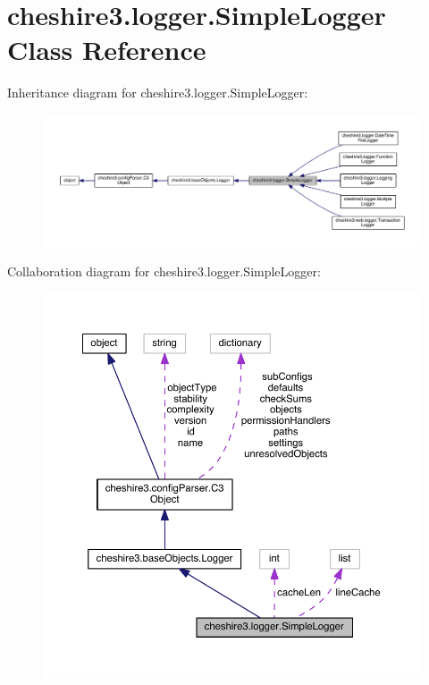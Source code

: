 \hypertarget{classcheshire3_1_1logger_1_1_simple_logger}{\section{cheshire3.\-logger.\-Simple\-Logger Class Reference}
\label{classcheshire3_1_1logger_1_1_simple_logger}
}


Inheritance diagram for cheshire3.\-logger.\-Simple\-Logger\-:
\nopagebreak
\begin{figure}[H]
\begin{center}
\leavevmode
\includegraphics[width=350pt]{classcheshire3_1_1logger_1_1_simple_logger__inherit__graph}
\end{center}
\end{figure}


Collaboration diagram for cheshire3.\-logger.\-Simple\-Logger\-:
\nopagebreak
\begin{figure}[H]
\begin{center}
\leavevmode
\includegraphics[width=350pt]{classcheshire3_1_1logger_1_1_simple_logger__coll__graph}
\end{center}
\end{figure}
